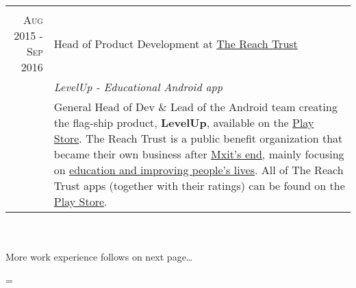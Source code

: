 \documentclass[a4paper,10pt,notitlepage]{article}
\newenvironment{absolutelynopagebreak}
  {\par\nobreak\vfil\penalty0\vfilneg
   \vtop\bgroup}
  {\par\xdef\tpd{\the\prevdepth}\egroup
   \prevdepth=\tpd}
\begin{document}
\begin{absolutelynopagebreak}
\begin{tabular}{r|p{11cm}}
{		\multicolumn{2}{c}{} \\
		\textsc{Aug 2015 - Sep 2016} & Head of Product Development at \href{www.thereachtrust.org}{The Reach Trust} \\                                                                  &\emph{LevelUp -  Educational Android app} \\
		                            &\footnotesize{General Head of Dev \& Lead of the Android team creating the  flag-ship product, \textbf{LevelUp}, available on the \href{https://play.google.com/store/apps/details?id=org.mylevelup}{Play Store}. The Reach Trust is a public benefit organization that became their own business after \href{https://memeburn.com/2015/10/mxit-confirms-its-shutting-up-shop/}{Mxit's end}, mainly focusing on \href{https://it-online.co.za/2015/10/26/reach-trust-will-use-mxit-for-education/}{education and improving people's lives}. All of The Reach Trust apps (together with their ratings) can be found on the \href{https://play.google.com/store/apps/dev?id=7356513661681471434}{Play Store}.} \\
		
	\end{tabular} \\ \\
	
	\footnotesize{More work experience follows on next page\ldots}
	
\end{absolutelynopagebreak}
\end{document}
